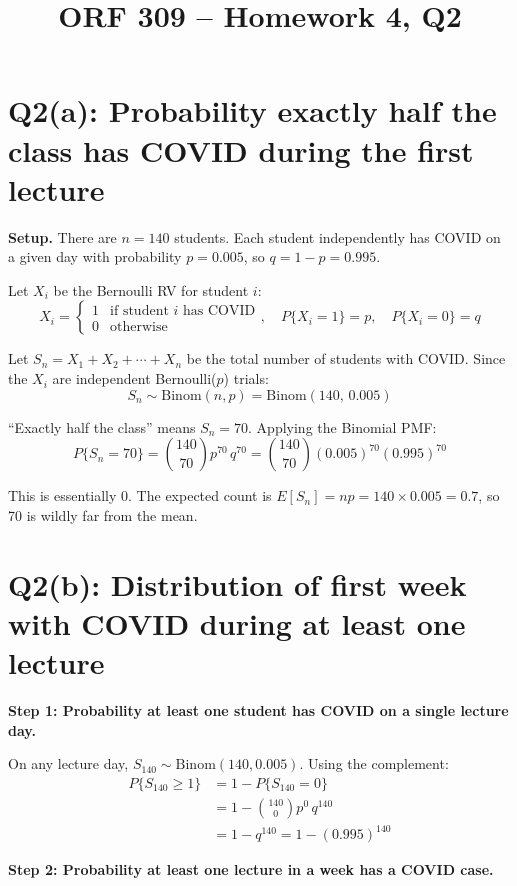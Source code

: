 \documentclass[12pt]{article}
\title{ORF 309 -- Homework 4, Q2}
\author{}
\date{}
\begin{document}
\maketitle

\section*{Q2(a): Probability exactly half the class has COVID during the first lecture}

\textbf{Setup.} There are $n = 140$ students. Each student independently has COVID on a given day with probability $p = 0.005$, so $q = 1 - p = 0.995$.

Let $X_i$ be the Bernoulli RV for student $i$:
\[
    X_i = \begin{cases} 1 & \text{if student } i \text{ has COVID} \\ 0 & \text{otherwise} \end{cases}, \quad P\{X_i = 1\} = p, \quad P\{X_i = 0\} = q
\]

Let $S_n = X_1 + X_2 + \cdots + X_n$ be the total number of students with COVID. Since the $X_i$ are independent Bernoulli($p$) trials:
\[
    S_n \sim \text{Binom}(n, p) = \text{Binom}(140,\, 0.005)
\]

``Exactly half the class'' means $S_n = 70$. Applying the Binomial PMF:
\[
    \boxed{P\{S_n = 70\} = \binom{140}{70} p^{70}\, q^{70} = \binom{140}{70} (0.005)^{70} (0.995)^{70}}
\]

This is essentially 0. The expected count is $E[S_n] = np = 140 \times 0.005 = 0.7$, so 70 is wildly far from the mean.

\section*{Q2(b): Distribution of first week with COVID during at least one lecture}

\textbf{Step 1: Probability at least one student has COVID on a single lecture day.}

On any lecture day, $S_{140} \sim \text{Binom}(140, 0.005)$. Using the complement:
\begin{align*}
    P\{S_{140} \geq 1\} &= 1 - P\{S_{140} = 0\} \\
    &= 1 - \binom{140}{0} p^0\, q^{140} \\
    &= 1 - q^{140} = 1 - (0.995)^{140}
\end{align*}

\textbf{Step 2: Probability at least one lecture in a week has a COVID case.}
\end{document}
